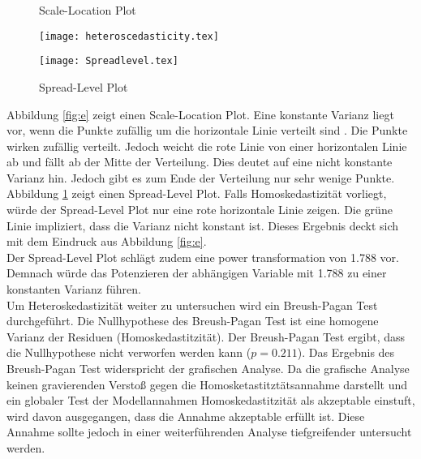 \documentclass[11pt,a4paper]{article}
\begin{document}
\begin{figure}
    \centering
    \begin{minipage}{0.45\textwidth}
\caption{Scale-Location Plot}\label{fig:e}
        \texttt{[image: heteroscedasticity.tex]} %
        
    \end{minipage}\hfill
    \begin{minipage}{0.45\textwidth}
\caption{Spread-Level Plot}\label{fig:f}
        \texttt{[image: Spreadlevel.tex]} %
        
    \end{minipage}
\end{figure}


Abbildung \ref{fig:e} zeigt einen Scale-Location Plot. Eine konstante Varianz liegt vor, wenn die Punkte zufällig um die horizontale Linie verteilt sind \parencite{kabacoff2015r}. Die Punkte wirken zufällig verteilt. Jedoch weicht die rote Linie von einer horizontalen Linie ab und fällt ab der Mitte der Verteilung. Dies deutet auf eine nicht konstante Varianz hin. Jedoch gibt es zum Ende der Verteilung nur sehr wenige Punkte.\\

Abbildung \ref{fig:f} zeigt einen Spread-Level Plot. Falls Homoskedastizität vorliegt, würde der Spread-Level Plot nur eine rote horizontale Linie zeigen. Die grüne Linie impliziert, dass die Varianz nicht konstant ist. Dieses Ergebnis deckt sich mit dem Eindruck aus Abbildung \ref{fig:e}.\\  
Der Spread-Level Plot schlägt zudem eine power transformation von 1.788 vor. Demnach würde das Potenzieren der abhängigen Variable mit 1.788 zu einer konstanten Varianz führen.\\ 

Um Heteroskedastizität weiter zu untersuchen wird ein Breush-Pagan Test durchgeführt. Die Nullhypothese des Breush-Pagan Test ist eine homogene Varianz der Residuen (Homoskedastitzität). Der Breush-Pagan Test ergibt, dass die Nullhypothese nicht verworfen werden kann ($p = 0.211$).
Das Ergebnis des Breush-Pagan Test widerspricht der grafischen Analyse. Da die grafische Analyse keinen gravierenden Verstoß gegen die Homosketastitztätsannahme darstellt und ein globaler Test der Modellannahmen Homoskedastitzität als akzeptable einstuft, wird davon ausgegangen, dass die Annahme akzeptable erfüllt ist. Diese Annahme sollte jedoch in einer weiterführenden Analyse tiefgreifender untersucht werden.  
\end{document}
